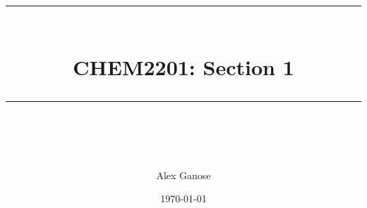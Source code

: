 \newcommand{\horrule}[1]{\rule{\linewidth}{#1}} %
\title{
  \normalfont \normalsize
  \horrule{0.5pt} \\[0.4cm]
  \huge CHEM2201: Section 1 \\
  \horrule{2pt} \\[0.5cm]
}

\author{Alex Ganose}
\date{\normalsize\today}